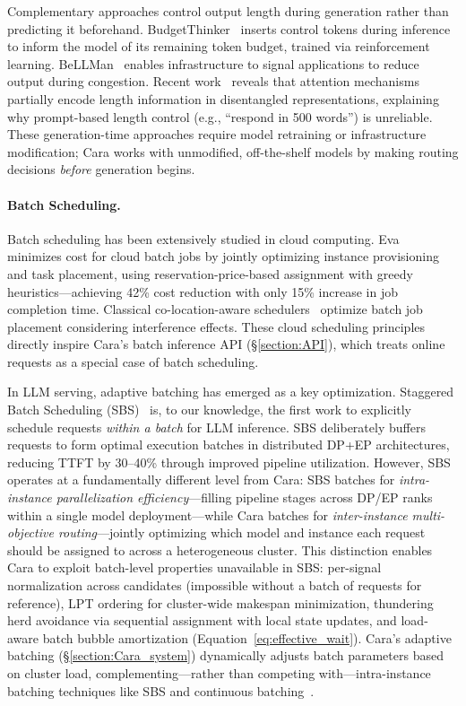 \documentclass[letterpaper, anonymous, twocolumn, 10pt]{article}
\begin{document}
Complementary approaches control output length during generation rather than predicting it beforehand.
BudgetThinker~\cite{budgetthinker2025} inserts control tokens during inference to inform the model of its remaining token budget, trained via reinforcement learning.
BeLLMan~\cite{bellman2025} enables infrastructure to signal applications to reduce output during congestion.
Recent work~\cite{lengthrepresentations2025} reveals that attention mechanisms partially encode length information in disentangled representations, explaining why prompt-based length control (e.g., ``respond in 500 words'') is unreliable.
These generation-time approaches require model retraining or infrastructure modification; Cara works with unmodified, off-the-shelf models by making routing decisions \emph{before} generation begins.

\paragraph{Batch Scheduling.}
Batch scheduling has been extensively studied in cloud computing.
Eva~\cite{eva-eurosys} minimizes cost for cloud batch jobs by jointly optimizing instance provisioning and task placement, using reservation-price-based assignment with greedy heuristics---achieving 42\% cost reduction with only 15\% increase in job completion time.
Classical co-location-aware schedulers~\cite{mai2013exploiting} optimize batch job placement considering interference effects.
These cloud scheduling principles directly inspire Cara's batch inference API (\S\ref{section:API}), which treats online requests as a special case of batch scheduling.

In LLM serving, adaptive batching has emerged as a key optimization.
Staggered Batch Scheduling (SBS)~\cite{sbs2025} is, to our knowledge, the first work to explicitly schedule requests \emph{within a batch} for LLM inference. SBS deliberately buffers requests to form optimal execution batches in distributed DP+EP architectures, reducing TTFT by 30--40\% through improved pipeline utilization.
However, SBS operates at a fundamentally different level from Cara: SBS batches for \emph{intra-instance parallelization efficiency}---filling pipeline stages across DP/EP ranks within a single model deployment---while Cara batches for \emph{inter-instance multi-objective routing}---jointly optimizing which model and instance each request should be assigned to across a heterogeneous cluster.
This distinction enables Cara to exploit batch-level properties unavailable in SBS: per-signal normalization across candidates (impossible without a batch of requests for reference), LPT ordering for cluster-wide makespan minimization, thundering herd avoidance via sequential assignment with local state updates, and load-aware batch bubble amortization (Equation~\ref{eq:effective_wait}).
Cara's adaptive batching (\S\ref{section:Cara_system}) dynamically adjusts batch parameters based on cluster load, complementing---rather than competing with---intra-instance batching techniques like SBS and continuous batching~\cite{kwon2023vllm}.
\end{document}
